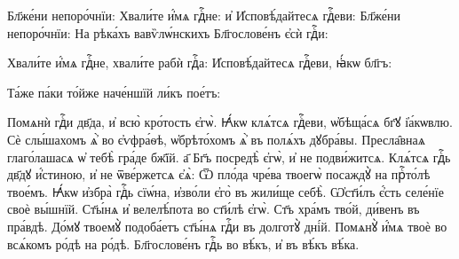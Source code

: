 \label{poly}  

 \hKv Бл҃же́ни непоро́чнїи:  Хвали́те и҆́мѧ гдⷭ҇не: \hKv и҆ И҆сповѣ́дайтесѧ  гдⷭ҇еви: 
 Бл҃же́ни непоро́чнїи: 
 На рѣка́хъ вавѷлѡ́нскихъ 
\hKv Бл҃гослове́нъ є҆сѝ гдⷭ҇и: 

 \hKv Хвали́те и҆́мѧ  гдⷭ҇не, хвали́те рабѝ гдⷭ҇а: 
 \hKv И҆сповѣ́дайтесѧ гдⷭ҇еви, ꙗ҆́кѡ бл҃гъ:

%


Та́же па́ки то́йже наче́ншїй ли́къ пое́тъ: 

\cuLettrine
Помѧнѝ гдⷭ҇и дв҃да, и҆ всю̀ кро́тость є҆гѡ̀. 
\hKv Ꙗ҆́кѡ клѧ́тсѧ гдⷭ҇еви, ѡ҆бѣща́сѧ бг҃ꙋ і҆а́кѡвлю. 
\hKv Сѐ  слы́шахомъ ѧ҆̀ во є҆ѵфра́ѳѣ, ѡ҆брѣто́хомъ ѧ҆̀ въ полѧ́хъ  дꙋбра́вы. 
\hKv Пресла̑внаѧ глаго́лашасѧ ѡ҆ тебѣ̀ гра́де  бж҃їй. а҃ Бг҃ъ посредѣ̀ є҆гѡ̀, и҆ не подви́житсѧ. 
\hKv  Клѧ́тсѧ гдⷭ҇ь дв҃дꙋ и҆́стиною,   и҆ не ѿве́ржетсѧ є҆ѧ̀: 
\hKv Ѿ пло́да чре́ва твоегѡ̀  посаждꙋ̀ на прⷭ҇то́лѣ твое́мъ. 
\hKv Ꙗ҆́кѡ и҆збра̀ гдⷭ҇ь  сїѡ́на, и҆зво́ли є҆го̀ въ жили́ще себѣ̀. 
\hKv Ѡ҆ст҃и́лъ  є҆́сть селе́нїе своѐ вы́шнїй. 
\hKv Ст҃ы́нѧ и҆ велелѣ́пота  во ст҃и́лѣ є҆гѡ̀. 
\hKv Ст҃ъ хра́мъ тво́й, ди́венъ въ  пра́вдѣ. 
\hKv До́мꙋ твоемꙋ̀ подоба́етъ ст҃ы́нѧ гдⷭ҇и въ  долготꙋ̀ дні́й. 
\hKv Помѧнꙋ̀ и҆́мѧ твоѐ во всѧ́комъ ро́дѣ  на ро́дѣ. 
\hKv Бл҃гослове́нъ гдⷭ҇ь во вѣ́къ, и҆ въ вѣ́къ  вѣ́ка. 

